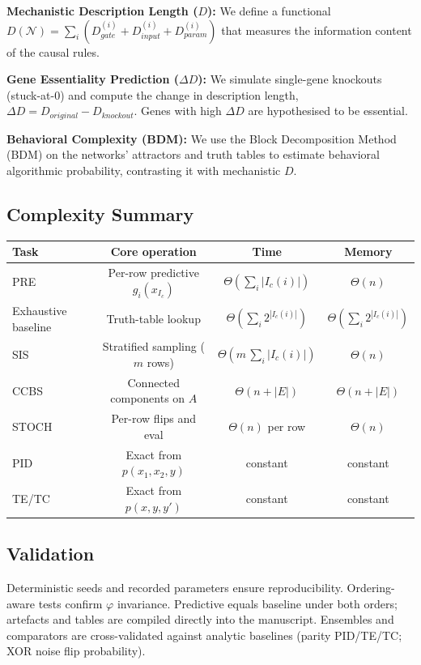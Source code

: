 \documentclass[11pt]{article}
\begin{document}
\textbf{Mechanistic Description Length ($D$):} We define a functional $D(\mathcal{N}) = \sum_i (D_{gate}^{(i)} + D_{input}^{(i)} + D_{param}^{(i)})$ that measures the information content of the causal rules.

\textbf{Gene Essentiality Prediction ($\Delta D$):} We simulate single-gene knockouts (stuck-at-0) and compute the change in description length, $\Delta D = D_{original} - D_{knockout}$. Genes with high $\Delta D$ are hypothesised to be essential.

\textbf{Behavioral Complexity (BDM):} We use the Block Decomposition Method (BDM) on the networks' attractors and truth tables to estimate behavioral algorithmic probability, contrasting it with mechanistic $D$.

\subsection{Complexity Summary}
\begin{center}
\begin{tabular}{lccc}
\hline
Task & Core operation & Time & Memory \\
\hline
PRE & Per-row predictive $g_i(x_{I_c})$ & $\Theta(\sum_i |I_c(i)|)$ & $\Theta(n)$ \\
Exhaustive baseline & Truth-table lookup & $\Theta(\sum_i 2^{|I_c(i)|})$ & $\Theta(\sum_i 2^{|I_c(i)|})$ \\
SIS & Stratified sampling ($m$ rows) & $\Theta(m\,\sum_i |I_c(i)|)$ & $\Theta(n)$ \\
CCBS & Connected components on $A$ & $\Theta(n+|E|)$ & $\Theta(n+|E|)$ \\
STOCH & Per-row flips and eval & $\Theta(n)$ per row & $\Theta(n)$ \\
PID & Exact from $p(x_1,x_2,y)$ & constant & constant \\
TE/TC & Exact from $p(x,y,y')$ & constant & constant \\
\hline
\end{tabular}
\end{center}

\subsection{Validation}
Deterministic seeds and recorded parameters ensure reproducibility. Ordering-aware tests confirm $\varphi$ invariance. Predictive equals baseline under both orders; artefacts and tables are compiled directly into the manuscript. Ensembles and comparators are cross-validated against analytic baselines (parity PID/TE/TC; XOR noise flip probability).
\end{document}
